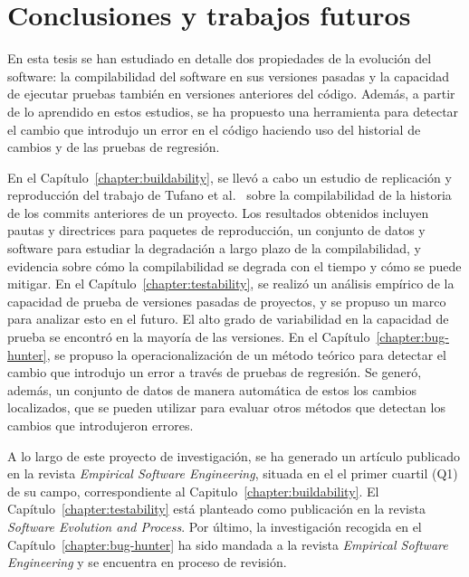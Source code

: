 \section{Conclusiones y trabajos futuros}
\label{sec:resumen:conclusiones}

En esta tesis se han estudiado en detalle dos propiedades de la evolución del software: la compilabilidad del software en sus versiones pasadas y la capacidad de ejecutar pruebas también en versiones anteriores del código. 
Además, a partir de lo aprendido en estos estudios, se ha propuesto una herramienta para detectar el cambio que introdujo un error en el código haciendo uso del historial de cambios y de las pruebas de regresión. 

En el Capítulo~\ref{chapter:buildability}, se llevó a cabo un estudio de replicación y reproducción del trabajo de Tufano et al.~\cite{tufano2017there} sobre la compilabilidad de la historia de los commits anteriores de un proyecto. Los resultados obtenidos incluyen pautas y directrices para paquetes de reproducción, un conjunto de datos y software para estudiar la degradación a largo plazo de la compilabilidad, y evidencia sobre cómo la compilabilidad se degrada con el tiempo y cómo se puede mitigar. 
En el Capítulo~\ref{chapter:testability}, se realizó un análisis empírico de la capacidad de prueba de versiones pasadas de proyectos, y se propuso un marco para analizar esto en el futuro. El alto grado de variabilidad en la capacidad de prueba se encontró en la mayoría de las versiones. 
En el Capítulo~\ref{chapter:bug-hunter}, se propuso la operacionalización de un método teórico para detectar el cambio que introdujo un error a través de pruebas de regresión. 
Se generó, además, un conjunto de datos de manera automática de estos los cambios localizados, que se pueden utilizar para evaluar otros métodos que detectan los cambios que introdujeron errores.

A lo largo de este proyecto de investigación, se ha generado un artículo publicado en la revista \textit{Empirical Software Engineering}, situada en el el primer cuartil (Q1) de su campo, correspondiente al Capitulo~\ref{chapter:buildability}. 
El Capítulo~\ref{chapter:testability} está planteado como publicación en la revista \textit{Software Evolution and Process}. 
Por último, la investigación recogida en el Capítulo~\ref{chapter:bug-hunter} ha sido mandada a la revista \textit{Empirical Software Engineering} y se encuentra en proceso de revisión.

